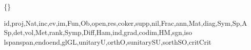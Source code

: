 

\def\@cntrprefix{\the\counter{part}.\the\counter{section}.\the\counter{subsection}.}

\def\pagedecor{\pageborder{rgb{.5 .9 .8}}{rgb{0 .3 .3}}{5}}
\def\setboxshadow{\def\boxshadowcolor{rgb{.3 .8 .7}}}
\def\contentbox{\bppbox{rgb{.7 1 .9}}{rgb{0 .3 .3}}{rgb{0 .4 .4}}}

\def\lrcorner{\delimiter"5479479\relax}
\def\imult{\mathbin{\lrcorner}}

\def\d{\mathop{}\!d}

\def\interior#1{{\mathop{\kern\z@#1}\limits^{\circ}}}

\def\eval#1{\left.#1\right|}
\def\pdvof#1#2{\frac{\partial #1}{\partial #2}}
\def\evpdvof#1#2{\eval{\pdvof{#1}{#2}}}
\def\pdv#1{\pdvof{}{#1}}
\def\evpdv#1{\eval{\pdv{#1}}}
\def\ipdvof#1#2{\partial #1/\partial #2}
\def\ievpdvof#1#2{\eval{\ipdvof{#1}{#2}}}
\def\ipdv#1{\ipdvof{}{#1}}
\def\ievpdv#1{\eval{\ipdv{#1}}}
\def\drvof#1#2{\frac{d#1}{d#2}}
\def\drv#1{\drvof{}{#1}}
\def\evdrv#1{\eval{\drv{#1}}}

\{{}\}


\commap{}
\commap{}
\commap{}
\commap{}

\def\mathnotefont{\sf}
\commap{}

\def\mathnamefont{\sf}
\commap{}

\makemathops\rm{id,proj,Nat,inc,ev,im,Fun,Ob,open,res,coker,supp,nil,Frac,ann,Mat,diag,Sym,Sp,ASp,det,vol,Met,rank,Symp,Diff,Ham,ind,grad,codim,HM,sgn,iso}
\makemathopsA\rm{{lspan}{span},{endo}{end},{gl}{GL},{unitary}{U},{orth}{O},{sunitary}{SU},{sorth}{SO},{crit}{Crit}}
\makemathopsA{}



